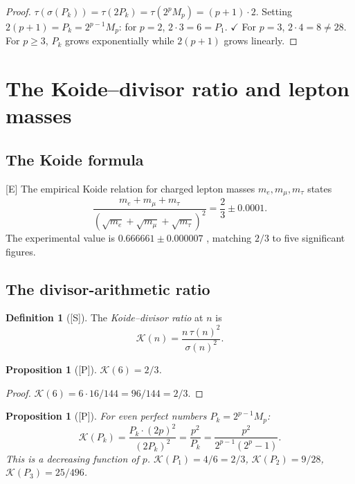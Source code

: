 \documentclass[11pt,letterpaper]{article}
\newtheorem{proposition}[theorem]{Proposition}
\theoremstyle{definition}
\newtheorem{definition}[theorem]{Definition}
\theoremstyle{remark}
\newcommand{\proven}{\textsf{[P]}}
\newcommand{\established}{\textsf{[E]}}
\newcommand{\speculative}{\textsf{[S]}}
\begin{document}
\begin{proof}
$\tau(\sigma(P_k)) = \tau(2P_k) = \tau(2^p M_p) = (p+1) \cdot 2$.
Setting $2(p+1) = P_k = 2^{p-1}M_p$: for $p=2$, $2\cdot 3 = 6 = P_1$. $\checkmark$
For $p=3$, $2\cdot 4 = 8 \neq 28$. For $p \geq 3$, $P_k$ grows exponentially 
while $2(p+1)$ grows linearly.
\end{proof}

\section{The Koide--divisor ratio and lepton masses}
\label{sec:koide}

\subsection{The Koide formula}

\established{} The empirical Koide relation \cite{Koide1983} for charged lepton 
masses $m_e, m_\mu, m_\tau$ states
\begin{equation}\label{eq:koide}
\frac{m_e + m_\mu + m_\tau}{(\sqrt{m_e}+\sqrt{m_\mu}+\sqrt{m_\tau})^2} 
= \frac{2}{3} \pm 0.0001.
\end{equation}
The experimental value is $0.666661 \pm 0.000007$ \cite{PDG2024}, 
matching $2/3$ to five significant figures.

\subsection{The divisor-arithmetic ratio}

\begin{definition}[\speculative]
The \emph{Koide--divisor ratio} at $n$ is
\begin{equation}\label{eq:koide-div}
\mathcal{K}(n) = \frac{n\,\tau(n)^2}{\sigma(n)^2}.
\end{equation}
\end{definition}

\begin{proposition}[\proven]\label{prop:koide-ratio}
$\mathcal{K}(6) = 2/3$.
\end{proposition}

\begin{proof}
$\mathcal{K}(6) = 6 \cdot 16 / 144 = 96/144 = 2/3$.
\end{proof}

\begin{proposition}[\proven]\label{prop:koide-general}
For even perfect numbers $P_k = 2^{p-1}M_p$:
\begin{equation}
\mathcal{K}(P_k) = \frac{P_k \cdot (2p)^2}{(2P_k)^2} = \frac{p^2}{P_k} 
= \frac{p^2}{2^{p-1}(2^p-1)}.
\end{equation}
This is a decreasing function of $p$. 
$\mathcal{K}(P_1) = 4/6 = 2/3$, $\mathcal{K}(P_2) = 9/28$, 
$\mathcal{K}(P_3) = 25/496$.
\end{proposition}
\end{document}
